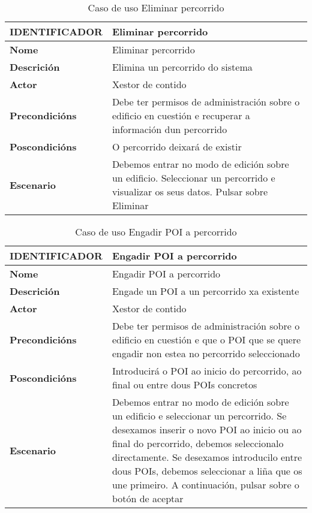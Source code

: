 \begin{table}[tbp]
	\begin{tabular}{|l|p{10cm}|}
		\hline 
		\textbf{IDENTIFICADOR}	& \textbf{Eliminar percorrido} \\ 
		\hline 
		\textbf{Nome} & Eliminar percorrido \\ 
		\hline 
		\textbf{Descrición} & Elimina un percorrido do sistema \\ 
		\hline 
		\textbf{Actor} & Xestor de contido \\ 
		\hline 
		\textbf{Precondicións} & Debe ter permisos de administración sobre o edificio en cuestión e recuperar a información dun percorrido \\ 
		\hline 
		\textbf{Poscondicións} & O percorrido deixará de existir \\ 
		\hline 
		\textbf{Escenario} & Debemos entrar no modo de edición sobre un edificio. Seleccionar un percorrido e visualizar os seus datos. Pulsar sobre Eliminar \\ 
		\hline 
	\end{tabular}
	\caption{Caso de uso Eliminar percorrido}
	\label{tab:cuEliminarPercorrido}
\end{table}

\begin{table}[tbp]
	\begin{tabular}{|l|p{10cm}|}
		\hline 
		\textbf{IDENTIFICADOR}	& \textbf{Engadir POI a percorrido} \\ 
		\hline 
		\textbf{Nome} & Engadir POI a percorrido \\ 
		\hline 
		\textbf{Descrición} & Engade un POI a un percorrido xa existente \\ 
		\hline 
		\textbf{Actor} & Xestor de contido \\ 
		\hline 
		\textbf{Precondicións} & Debe ter permisos de administración sobre o edificio en cuestión e que o POI que se quere engadir non estea no percorrido seleccionado \\ 
		\hline 
		\textbf{Poscondicións} & Introducirá o POI ao inicio do percorrido, ao final ou entre dous POIs concretos \\ 
		\hline 
		\textbf{Escenario} & Debemos entrar no modo de edición sobre un edificio e seleccionar un percorrido. Se desexamos inserir o novo POI ao inicio ou ao final do percorrido, debemos seleccionalo directamente. Se desexamos introducilo entre dous POIs, debemos seleccionar a liña que os une primeiro. A continuación, pulsar sobre o botón de aceptar \\ 
		\hline 
	\end{tabular}
	\caption{Caso de uso Engadir POI a percorrido}
	\label{tab:cuEngadirPOIPercorrido}
\end{table}

